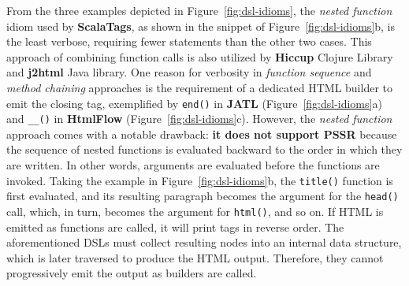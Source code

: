\documentclass[software,article,accept,pdftex,moreauthors]{Definitions/mdpi}
\begin{document}
From the three examples depicted in Figure~\ref{fig:dsl-idioms}, the
\textit{nested function} idiom used by \textbf{ScalaTags}, as shown in the
snippet of Figure~\ref{fig:dsl-idioms}b, is the least verbose, requiring
fewer statements than the other two cases. This approach of combining function
calls is also utilized by \textbf{Hiccup} Clojure Library and \textbf{j2html}
Java library. One reason for verbosity in \textit{function sequence} and
\textit{method chaining} approaches is the requirement of a dedicated HTML
builder to emit the closing tag, exemplified by \texttt{end()} in \textbf{JATL}
(Figure~\ref{fig:dsl-idioms}a) and \texttt{\_\_()} in \textbf{HtmlFlow}
(Figure~\ref{fig:dsl-idioms}c). However, the \textit{nested function} approach
comes with a notable drawback: \textbf{it does not support PSSR} because the
sequence of nested functions is evaluated backward to the order in which they
are written. In other words, arguments are evaluated before the functions are
invoked. Taking the example in Figure~\ref{fig:dsl-idioms}b, the
\texttt{title()} function is first evaluated, and its resulting paragraph
becomes the argument for the \texttt{head()} call, which, in turn, becomes the
argument for \texttt{html()}, and so on. If HTML is emitted as functions are
called, it will print tags in reverse order. The aforementioned DSLs must
collect resulting nodes into an internal data structure, which is later
traversed to produce the HTML output. Therefore, they cannot progressively emit
the output as builders are called.
\end{document}
